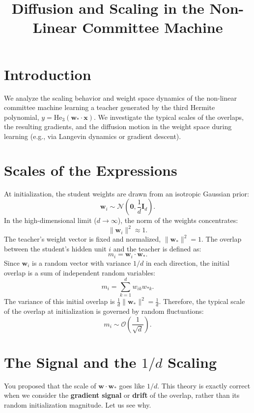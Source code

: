 \documentclass{article}
\begin{document}
\title{Diffusion and Scaling in the Non-Linear Committee Machine}
\author{}
\date{}
\maketitle

\section{Introduction}
We analyze the scaling behavior and weight space dynamics of the non-linear committee machine learning a teacher generated by the third Hermite polynomial, $y = \text{He}_3(\boldsymbol{w}_* \cdot \boldsymbol{x})$. We investigate the typical scales of the overlaps, the resulting gradients, and the diffusion motion in the weight space during learning (e.g., via Langevin dynamics or gradient descent). 

\section{Scales of the Expressions}
At initialization, the student weights are drawn from an isotropic Gaussian prior:
\[
\boldsymbol{w}_i \sim \mathcal{N}\left(\boldsymbol{0}, \frac{1}{d}\boldsymbol{I}_d\right).
\]
In the high-dimensional limit ($d \to \infty$), the norm of the weights concentrates:
\[
\|\boldsymbol{w}_i\|^2 \approx 1.
\]
The teacher's weight vector is fixed and normalized, $\|\boldsymbol{w}_*\|^2 = 1$. The overlap between the student's hidden unit $i$ and the teacher is defined as:
\[
m_i = \boldsymbol{w}_i \cdot \boldsymbol{w}_*.
\]
Since $\boldsymbol{w}_i$ is a random vector with variance $1/d$ in each direction, the initial overlap is a sum of independent random variables:
\[
m_i = \sum_{k=1}^d w_{ik} w_{*k}.
\]
The variance of this initial overlap is $\frac{1}{d} \|\boldsymbol{w}_*\|^2 = \frac{1}{d}$. Therefore, the typical scale of the overlap at initialization is governed by random fluctuations:
\[
m_i \sim \mathcal{O}\left(\frac{1}{\sqrt{d}}\right).
\]

\section{The Signal and the $1/d$ Scaling}
You proposed that the scale of $\boldsymbol{w} \cdot \boldsymbol{w}_*$ goes like $1/d$. This theory is exactly correct when we consider the \textbf{gradient signal} or \textbf{drift} of the overlap, rather than its random initialization magnitude. Let us see why.
\end{document}
